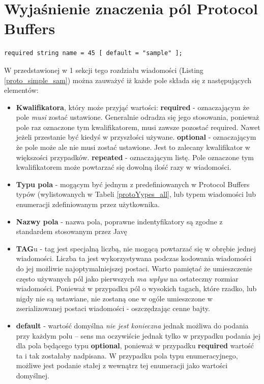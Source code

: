 \section{Wyjaśnienie znaczenia pól Protocol Buffers}
\label{sec:typeQialifiers}

\begin{lstlisting}[caption={Przypomnienie wyglądu deklaracji pola wiadomości}]
 required string name = 45 [ default = "sample" ];
\end{lstlisting}

W przedstawionej w 1 sekcji tego rozdziału wiadomości (Listing \ref{proto_simple_sam}) można zauważyć iż każde pole składa się z następujących elementów:

\begin{itemize}
 \item \textbf{Kwalifikatora}, który może przyjąć wartości:
  \subitem \textbf{required} - oznaczającym że pole \textit{musi} zostać ustawione. Generalnie odradza się jego stosowania, ponieważ 
                               pole raz oznaczone tym kwalifikatorem, musi zawsze pozostać required. Nawet jeżeli przestanie być kiedyś w przyszłości używane.
  \subitem \textbf{optional} - oznaczającym że pole może ale nie musi zostać ustawione. Jest to zalecany kwalifikator w większości przypadków.
  \subitem \textbf{repeated} - oznaczającym listę. Pole oznaczone tym kwalifikatorem może powtarzać się dowolną ilość razy w wiadomości.
 \item \textbf{Typu pola} - mogącym być jednym z predefiniowanych w Protocol Buffers typów (wylistowanych w Tabeli \ref{protoYypes_all}, lub typem wiadomości lub enumeracji
                            zdefiniowanym przez użytkownika.
 \item \textbf{Nazwy pola} - nazwa pola, poprawne indentyfikatory są zgodne z standardem stosowanym przez Javę
 \item \textbf{TAG}u - tag jest specjalną liczbą, nie mogącą powtarzać się w obrębie jednej wiadomości. Liczba ta jest wykorzystywana podczas kodowania 
                       wiadomości do jej możliwie najoptymalniejszej postaci. Warto pamiętać że umieszczenie często używanych pól jako pierwszych \textit{ma wpływ}
                       na ostateczny rozmiar wiadomości. Ponieważ w przypadku pól o wysokich tagach, które rzadko, lub nigdy nie są ustawiane, nie zostaną one w ogóle 
                       umieszczone w zserializowanej postaci wiadomości - oszczędzając cenne bajty.
 \item \textbf{default} - wartość domyślna \textit{nie jest konieczna} jednak możliwa do podania przy każdym polu -- sens ma oczywiście jednak tylko w przypadku 
                          podania jej dla pola będącego typu \textbf{optional}, ponieważ w przypadku \textbf{required} wartość ta i tak zostałaby nadpisana.
                          W przypadku pola typu enumeracyjnego, możliwe jest podanie stałej z wewnątrz tej enumeracji jako wartości domyślnej.
\end{itemize}

